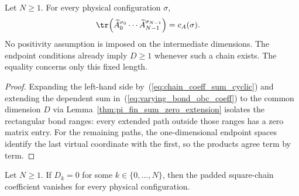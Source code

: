 \begin{lemma}
    \label{thm:varying_bond_obc_zero_pad_coeff}
    \leanok
    Let $N\geq1$. For every physical configuration $\sigma$,
    \begin{align}
        \tr\!\left(\widetilde A_0^{\sigma_0}\cdots
        \widetilde A_{N-1}^{\sigma_{N-1}}\right)
         & =c_A(\sigma).
        \label{eq:varying_bond_obc_zero_pad_coeff}
    \end{align}
    No positivity assumption is imposed on the intermediate dimensions. The
    endpoint conditions already imply $D\geq1$ whenever such a chain exists.
    The equality concerns only this fixed length.
\end{lemma}

\begin{proof}
    \leanok
    Expanding the left-hand side by~(\ref{eq:chain_coeff_sum_cyclic}) and extending the
    dependent sum in~(\ref{eq:varying_bond_obc_coeff}) to the common dimension
    $D$ via Lemma~\ref{thm:pi_fin_sum_zero_extension} isolates the rectangular bond ranges: every extended path
    outside those ranges has a zero matrix entry. For the
    remaining paths, the one-dimensional endpoint spaces identify the last
    virtual coordinate with the first, so the products agree term by term.
\end{proof}

\begin{lemma}
    \label{thm:varying_bond_obc_zero_pad_zero_bond}
    \leanok
    Let $N\geq1$. If $D_k=0$ for some
    $k\in\{0,\ldots,N\}$, then the padded square-chain coefficient vanishes
    for every physical configuration.
\end{lemma}

